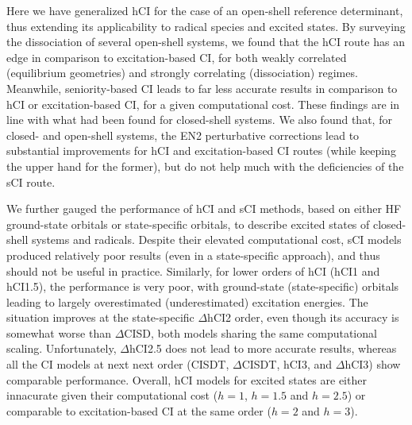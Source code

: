\documentclass[aip,jcp,reprint,noshowkeys,superscriptaddress]{revtex4-1}
\begin{document}

Here we have generalized hCI \cite{Kossoski_2022} for the case of an open-shell reference determinant, thus extending its applicability to radical species and excited states.
By surveying the dissociation of several open-shell systems, 
we found that the hCI route has an edge in comparison to excitation-based CI, for both weakly correlated (equilibrium geometries) and strongly correlating (dissociation) regimes.
Meanwhile, seniority-based CI leads to far less accurate results in comparison to hCI or excitation-based CI, for a given computational cost.
These findings are in line with what had been found for closed-shell systems. \cite{Kossoski_2022}
We also found that, for closed- and open-shell systems,
the EN2 perturbative corrections lead to substantial improvements for hCI and excitation-based CI routes (while keeping the upper hand for the former), but do not help much with the deficiencies of the sCI route.

We further gauged the performance of hCI and sCI methods, based on either HF ground-state orbitals or state-specific orbitals, to describe excited states of closed-shell systems and radicals.
Despite their elevated computational cost, sCI models produced relatively poor results (even in a state-specific approach), and thus should not be useful in practice.
Similarly, for lower orders of hCI (hCI1 and hCI1.5), the performance is very poor,
with ground-state (state-specific) orbitals leading to largely overestimated (underestimated) excitation energies.
The situation improves at the state-specific $\Delta$hCI2 order, even though its accuracy is somewhat worse than $\Delta$CISD, both models sharing the same computational scaling. 
Unfortunately, $\Delta$hCI2.5 does not lead to more accurate results, whereas all the CI models at next next order (CISDT, $\Delta$CISDT, hCI3, and $\Delta$hCI3) show comparable performance.
Overall, hCI models for excited states are either innacurate given their computational cost ($h=1$, $h=1.5$ and $h=2.5$) or comparable to excitation-based CI at the same order ($h=2$ and $h=3$).
\end{document}
